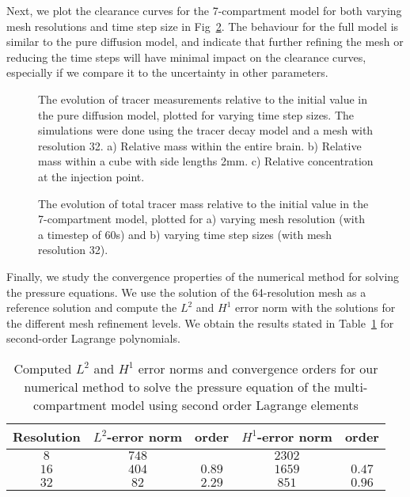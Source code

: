 \documentclass[10pt]{article}
\newcommand{\1}{^{(1)}}
\newcommand{\2}{^{(2)}}
\begin{document}
Next, we plot the clearance curves for the 7-compartment model for both varying mesh resolutions and time step size in Fig~\ref{fig: 7comp convergence}. The behaviour for the full model is similar to the pure diffusion model, and indicate that further refining the mesh or reducing the time steps will have minimal impact on the clearance curves, especially if we compare it to the uncertainty in other parameters.

\begin{figure}
    \centering
    \caption{The evolution of tracer measurements relative to the initial value in the pure diffusion model, plotted for varying time step sizes. The simulations were done using the tracer decay model and a mesh with resolution 32. a) Relative mass within the entire brain. b) Relative mass within a cube with side lengths 2mm. c) Relative concentration at the injection point.}
    \label{fig: diffusion time step size}
\end{figure}


\begin{figure}
    \centering
    \caption{The evolution of total tracer mass relative to the initial value in the 7-compartment model, plotted for a) varying mesh resolution (with a timestep of 60s) and b) varying time step sizes (with mesh resolution 32).}
    \label{fig: 7comp convergence}
\end{figure}

Finally, we study the convergence properties of the numerical method for solving the pressure equations. We use the solution of the 64-resolution mesh as a reference solution and compute the $L^2$ and $H^1$ error norm with the solutions for the different mesh refinement levels. We obtain the results stated in Table~\ref{tab:error-pressure} for second-order Lagrange polynomials. 
\begin{table}[h]
    \centering
    \begin{tabular}{c|c|c|c|c}
         Resolution & $L^2$-error norm & order & $H^1$-error norm & order \\
         \hline 
         $8$ & $748$ & & $2302$ &  \\
         $16$ & $404$ & $0.89$ & $1659$ & $0.47$\\
         $32$ & $82$ & $2.29$ & $851$ &  $0.96$ \\
    \end{tabular}
    \caption{Computed $L^2$ and $H^1$ error norms and convergence orders for our numerical method to solve the pressure equation of the multi-compartment model using second order Lagrange elements}
    \label{tab:error-pressure}
\end{table}
\FloatBarrier


\end{document}
